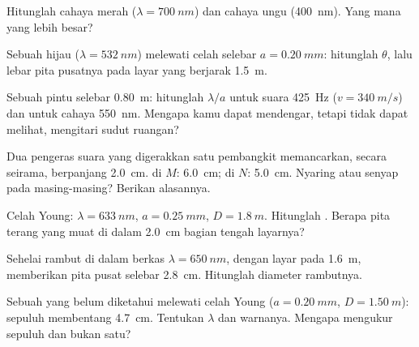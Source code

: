 \begin{exercise}[$\star$]\label{exo:g12:light-as-wave:1}
Hitunglah  cahaya merah ($\lambda = \qty{700}{nm}$) dan cahaya
ungu (\qty{400}{nm}). Yang mana yang lebih besar?
\end{exercise}

\begin{exercise}[$\star$]\label{exo:g12:light-as-wave:2}
Sebuah  hijau ($\lambda = \qty{532}{nm}$) melewati celah selebar
$a = \qty{0.20}{mm}$: hitunglah $\theta$, lalu lebar pita pusatnya pada
layar yang berjarak \qty{1.5}{m}.
\end{exercise}

\begin{exercise}[$\star$]\label{exo:g12:light-as-wave:3}
Sebuah pintu selebar \qty{0.80}{m}: hitunglah $\lambda/a$ untuk suara
\qty{425}{Hz} ($v = \qty{340}{m/s}$) dan untuk cahaya \qty{550}{nm}.
Mengapa kamu dapat mendengar, tetapi tidak dapat melihat, mengitari
sudut ruangan?
\end{exercise}

\begin{exercise}[$\star$]\label{exo:g12:light-as-wave:4}
Dua pengeras suara yang digerakkan satu pembangkit memancarkan, secara
seirama,  berpanjang  \qty{2.0}{cm}.  di
$M$: \qty{6.0}{cm}; di $N$: \qty{5.0}{cm}. Nyaring atau senyap pada
masing-masing? Berikan alasannya.
\end{exercise}

\begin{exercise}[$\star$]\label{exo:g12:light-as-wave:5}
Celah Young: $\lambda = \qty{633}{nm}$, $a = \qty{0.25}{mm}$,
$D = \qty{1.8}{m}$. Hitunglah . Berapa pita terang
yang muat di dalam \qty{2.0}{cm} bagian tengah layarnya?
\end{exercise}

\begin{exercise}[$\star\star$]\label{exo:g12:light-as-wave:6}
Sehelai rambut di dalam berkas $\lambda = \qty{650}{nm}$, dengan layar
pada \qty{1.6}{m}, memberikan pita pusat selebar \qty{2.8}{cm}.
Hitunglah diameter rambutnya.
\end{exercise}

\begin{exercise}[$\star\star$]\label{exo:g12:light-as-wave:7}
Sebuah  yang belum diketahui melewati celah Young
($a = \qty{0.20}{mm}$, $D = \qty{1.50}{m}$): sepuluh 
membentang \qty{4.7}{cm}. Tentukan $\lambda$ dan warnanya. Mengapa
mengukur sepuluh dan bukan satu?
\end{exercise}

